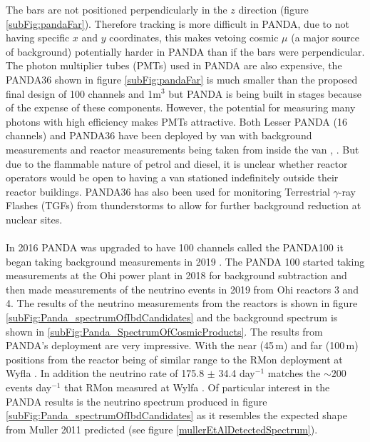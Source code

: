 The bars are not positioned perpendicularly in the $z$ direction (figure \ref{subFig:pandaFar}). Therefore tracking is more difficult in PANDA, due to not having specific $x$ and $y$ coordinates, this makes vetoing cosmic $\mu$ (a major source of background) potentially harder in PANDA than if the bars were perpendicular. The photon multiplier tubes (PMTs) used in PANDA are also expensive, the PANDA36 shown in figure \ref{subFig:pandaFar} is much smaller than the proposed final design of 100 channels and 1m$^3$ \cite{PANDA_2012} but PANDA is being built in stages because of the expense of these components. However, the potential for measuring many photons with high efficiency makes PMTs attractive. Both Lesser PANDA (16 channels) and PANDA36 have been deployed by van with background measurements and reactor measurements being taken from inside the van \cite{PANDA_2012}, \cite{PANDA_2014}. But due to the flammable nature of petrol and diesel, it is unclear whether reactor operators would be open to having a van stationed indefinitely outside their reactor buildings. PANDA36 has also been used for monitoring Terrestrial $\gamma$-ray Flashes (TGFs) from thunderstorms to allow for further background reduction at nuclear sites\cite{PANDA_tgf}.
\\\\In 2016 PANDA was upgraded to have 100 channels called the PANDA100 it began taking background measurements in 2019 \cite{Iwata_2019}. The PANDA 100 started taking measurements at the Ohi power plant in 2018 for background subtraction and then made measurements of the neutrino events in 2019 from Ohi reactors 3 and 4. The results of the neutrino measurements from the reactors is shown in figure \ref{subFig:Panda_spectrumOfIbdCandidates} and the background spectrum is shown in \ref{subFig:Panda_SpectrumOfCosmicProducts}. The results from PANDA's deployment are very impressive. With the near (45\,m) and far (100\,m) positions from the reactor being of similar range to the RMon deployment at Wyfla \cite{Carroll_2018}. In addition the neutrino rate of 175.8 $\pm$ 34.4 day$^{-1}$ \cite{IIRIE_Panda_2021} matches the $\sim 200$ events day$^{-1}$ that RMon measured at Wylfa \cite{Carroll_2018}. Of particular interest in the PANDA results is the neutrino spectrum produced in figure \ref{subFig:Panda_spectrumOfIbdCandidates} as it resembles the expected shape from Muller 2011 \cite{Mueller_2011} predicted (see figure \ref{mullerEtAlDetectedSpectrum}).

